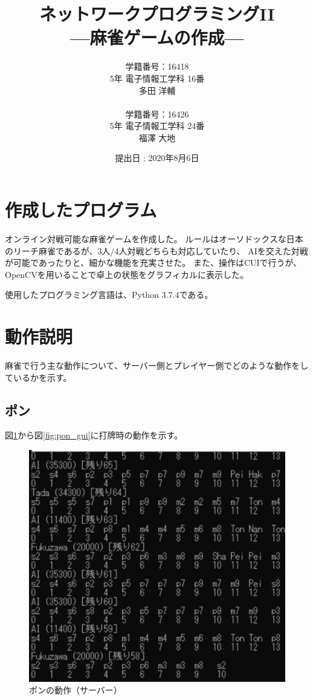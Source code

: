 \documentclass[a4j,titlepage]{jsarticle}
\begin{document}
\begin{titlepage}
  \title{\huge{ネットワークプログラミングI\hspace{-.1em}I} \\ \LARGE{---麻雀ゲームの作成---}}
  \author{
    学籍番号：16418 \\ 5年 電子情報工学科 16番 \\ 多田 洋輔 \\ \\
    学籍番号：16426 \\ 5年 電子情報工学科 24番 \\ 福澤 大地
  }
	\date{提出日 : 2020年8月6日}
  \maketitle
\end{titlepage}


\section{作成したプログラム}
オンライン対戦可能な麻雀ゲームを作成した。
ルールはオーソドックスな日本のリーチ麻雀であるが、3人/4人対戦どちらも対応していたり、
AIを交えた対戦が可能であったりと、細かな機能を充実させた。
また、操作はCUIで行うが、OpenCVを用いることで卓上の状態をグラフィカルに表示した。

使用したプログラミング言語は、Python 3.7.4である。


\section{動作説明}
麻雀で行う主な動作について、サーバー側とプレイヤー側でどのような動作をしているかを示す。

\subsection{ポン}
図\ref{fig:pon_server}から図\ref{fig:pon_gui}に打牌時の動作を示す。

\begin{figure}[htbp]
  \centering
  \includegraphics[width = 0.8\linewidth]{images/pon_server.png}
  \caption{ポンの動作（サーバー）}
  \label{fig:pon_server}
\end{figure}
\end{document}
